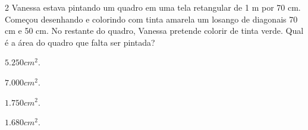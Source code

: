 {{{{%

\num{2} Vanessa estava pintando um quadro em uma tela retangular de 1 m por
70 cm. Começou desenhando e colorindo com tinta amarela um losango de
diagonais 70 cm e 50 cm. No restante do quadro, Vanessa pretende colorir
de tinta verde. Qual é a área do quadro que falta ser pintada?


\begin{escolha}[itemsep=0pt]
\item $5.250 cm^2$.
\item $7.000 cm^2$.
\item $1.750 cm^2$.
\item $1.680 cm^2$.
\end{escolha}

















}}}}
